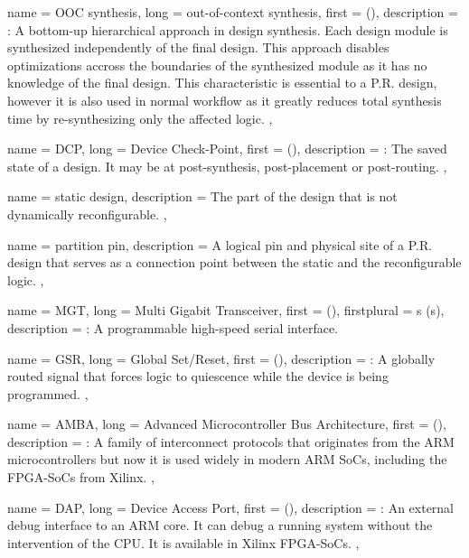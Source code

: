 {
	name = {OOC synthesis},
	long = {out-of-context synthesis},
	first = { ()},
	description = {\emph{}:
		A bottom-up hierarchical approach in design synthesis. 
		Each design module is synthesized independently of the final design.
		This approach disables optimizations accross the boundaries of the
		synthesized module as it has no knowledge of the final design.
		This characteristic is essential to a P.R. design, however it is also
		used in normal workflow as it greatly reduces total synthesis time by
		re-synthesizing only the affected logic.
	},
}

{
	name = {DCP},
	long = {Device Check-Point},
	first = { ()},
	description = {\emph{}:
		The saved state of a design. It may be at post-synthesis, post-placement or post-routing.
	},
}

{
	name = {static design},
	description = {
		The part of the design that is not dynamically reconfigurable.
	},
}

{
	name = {partition pin},
	description = {
		A logical pin and physical site of a P.R. design that 
		serves as a connection point between the static and the reconfigurable logic.
	},
}

{
	name = {MGT},
	long = {Multi Gigabit Transceiver},
	first = { ()},
	firstplural = {s (s)},
	description = {\emph{}:
		A programmable high-speed serial interface.
	}
}

{
	name = {GSR},
	long = {Global Set/Reset},
	first = { ()},
	description = {\emph{}:
		A globally routed signal that forces logic to 
		quiescence while the device is being programmed.
	},
}

{
	name = {AMBA},
	long = {Advanced Microcontroller Bus Architecture},
	first = { ()},
	description = {\emph{}:
		A family of interconnect protocols that originates 
		from the ARM microcontrollers but now it is used widely
		in modern ARM SoCs, including the FPGA-SoCs from Xilinx.
	},
}


{
	name = {DAP},
	long = {Device Access Port},
	first = { ()},
	description = {\emph{}:
		An external debug interface to an ARM core. It can debug a running system
		without the intervention of the CPU. It is available in Xilinx FPGA-SoCs.
	},
}

